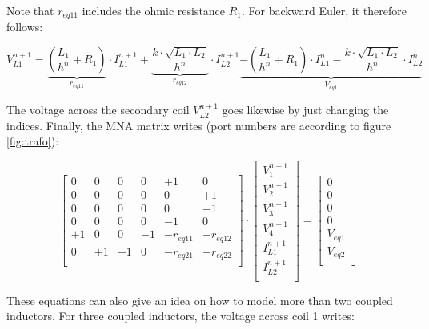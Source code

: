 Note that $r_{eq11}$ includes the ohmic resistance $R_1$. For backward
Euler, it therefore follows:

\begin{equation}
V_{L1}^{n+1} = \underbrace{\left(\dfrac{L_1}{h^n} + R_1 \right)}_{r_{eq11}}\cdot I_{L1}^{n+1}
             + \underbrace{\dfrac{k\cdot\sqrt{L_1\cdot L_2}}{h^n}}_{r_{eq12}}\cdot I_{L2}^{n+1}
             \underbrace{- \left(\dfrac{L_1}{h^n} + R_1 \right)\cdot I_{L1}^n
             - \dfrac{k\cdot\sqrt{L_1\cdot L_2}}{h^n}\cdot I_{L2}^n}_{V_{eq1}}
\end{equation}

The voltage across the secondary coil $V_{L2}^{n+1}$ goes likewise by
just changing the indices.  Finally, the MNA matrix writes (port
numbers are according to figure \ref{fig:trafo}):

\begin{equation}
\begin{bmatrix}
0 & 0 & 0 & 0 & +1 &  0\\
0 & 0 & 0 & 0 &  0 & +1\\
0 & 0 & 0 & 0 &  0 & -1\\
0 & 0 & 0 & 0 & -1 &  0\\
+1 & 0 & 0 & -1 & -r_{eq11} & -r_{eq12}\\
0 & +1 & -1 & 0 & -r_{eq21} & -r_{eq22}\\
\end{bmatrix}
\cdot
\begin{bmatrix}
V_1^{n+1}\\
V_2^{n+1}\\
V_3^{n+1}\\
V_4^{n+1}\\
I_{L1}^{n+1}\\
I_{L2}^{n+1}\\
\end{bmatrix}
=
\begin{bmatrix}
0\\
0\\
0\\
0\\
V_{eq1}\\
V_{eq2}\\
\end{bmatrix}
\end{equation}

These equations can also give an idea on how to model more than two
coupled inductors. For three coupled inductors, the voltage across
coil 1 writes:

